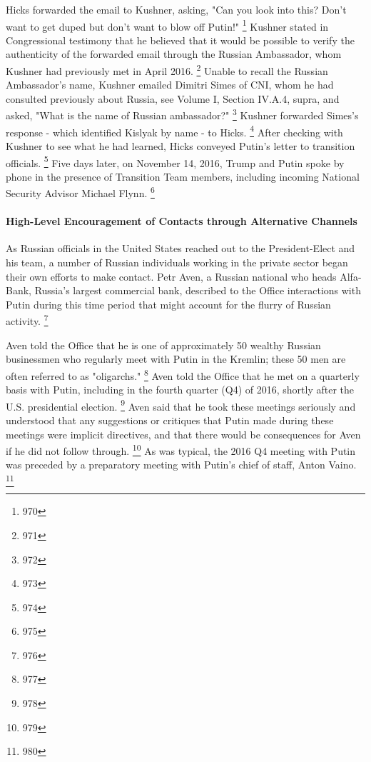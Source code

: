 Hicks forwarded the email to Kushner, asking, "Can you look into this?
Don't want to get duped but don't want to blow off Putin!"%
\footnote{970}
Kushner stated in Congressional testimony that he believed that it would be possible to verify the authenticity of the forwarded email through the Russian Ambassador, whom Kushner had previously met in April 2016.%
\footnote{971}
Unable to recall the Russian Ambassador's name, Kushner emailed Dimitri Simes of CNI, whom he had consulted previously about Russia, see Volume I, Section IV.A.4, supra, and asked, "What is the name of Russian ambassador?"%
\footnote{972}
Kushner forwarded Simes's response - which identified Kislyak by name - to Hicks.%
\footnote{973}
After checking with Kushner to see what he had learned, Hicks conveyed Putin's letter to transition officials.%
\footnote{974}
Five days later, on November 14, 2016, Trump and Putin spoke by phone in the presence of Transition Team members, including incoming National Security Advisor Michael Flynn.%
\footnote{975}

\paragraph{High-Level Encouragement of Contacts through Alternative Channels}

As Russian officials in the United States reached out to the President-Elect and his team, a number of Russian individuals working in the private sector began their own efforts to make contact.
Petr Aven, a Russian national who heads Alfa-Bank, Russia's largest commercial bank, described to the Office interactions with Putin during this time period that might account for the flurry of Russian activity.%
\footnote{976}

Aven told the Office that he is one of approximately 50 wealthy Russian businessmen who regularly meet with Putin in the Kremlin; these 50 men are often referred to as "oligarchs."%
\footnote{977}
Aven told the Office that he met on a quarterly basis with Putin, including in the fourth quarter (Q4) of 2016, shortly after the U.S. presidential election.%
\footnote{978}
Aven said that he took these meetings seriously and understood that any suggestions or critiques that Putin made during these meetings were implicit directives, and that there would be consequences for Aven if he did not follow through.%
\footnote{979}
As was typical, the 2016 Q4 meeting with Putin was preceded by a preparatory meeting with Putin's chief of staff, Anton Vaino.%
\footnote{980}

